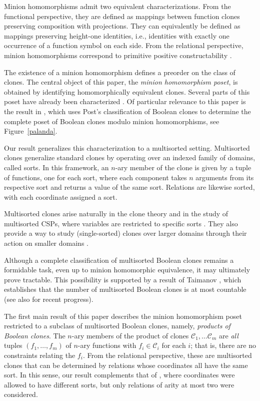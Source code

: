\documentclass{amsart}
\numberwithin{equation}{section}
\theoremstyle{plain}
\theoremstyle{definition}
\def\clone#1{\mathcal{#1}}
\begin{document}
 Minion homomorphisms admit two equivalent characterizations. From the functional perspective, they are defined as mappings between function clones preserving composition with projections. They can equivalently be defined as mappings preserving height-one identities, i.e., identities with exactly one occurrence of a function symbol on each side.
 From the relational perspective, minion homomorphisms correspond to  primitive positive constructability \cite{wonderland}. 
 
 The existence of a minion homomorphism defines a preorder on the class of clones.
 The central object of this paper, the \emph{minion homomorphism poset}, is obtained by identifying homomorphically equivalent clones.
       Several parts of this poset have already been characterized \cite{vucaj, florian1, florian2, florian3, kapytka}. Of particular relevance to this paper is the result in \cite{vucaj}, which uses Post's classification of Boolean clones \cite{post} to determine the complete poset of Boolean clones modulo minion homomorphisms, see Figure~\ref{palanda}.         

    Our result generalizes this characterization to a multisorted setting. Multisorted clones generalize standard clones by operating over an indexed family of domains, called sorts. In this framework, an $n$-ary member of the clone is given by a tuple of functions, one for each sort, where each component takes $n$ arguments from its respective sort and returns a value of the same sort. Relations are likewise sorted, with each coordinate assigned a sort.

    Multisorted clones arise naturally in the clone theory \cite{romov} and in the study of multisorted CSPs, where variables are restricted to specific sorts \cite{david}. They also provide a way to study (single-sorted) clones over larger domains through their action on smaller domains \cite{kapytka}.  
    
    Although a complete classification of multisorted Boolean clones remains a formidable task, even up to minion homomorphic equivalence, it may ultimately prove tractable. This possibility is supported by a result of Taimanov \cite{taimanov1, taimanov2, taimanov3}, which establishes that the number of multisorted Boolean clones is at most countable (see also \cite{david} for recent progress). 

    The first main result of this paper describes the minion homomorphism poset restricted to a subclass of multisorted Boolean clones, namely, \emph{products of Boolean clones}. The $n$-ary members of the product of clones $\clone{C}_1, \dots\clone{C}_m $ are \emph{all} tuples $(f_1,\dots,f_m)$ of $n$-ary functions with $f_i \in \clone{C}_i$ for each $i$; that is, there are no constraints relating the $f_i$. From the relational perspective, these are multisorted clones that can be determined by relations whose coordinates all have the same sort. In this sense, our result complements that of \cite{kapytka}, where coordinates were allowed to have different sorts, but only relations of arity at most two were considered. 
\end{document}
